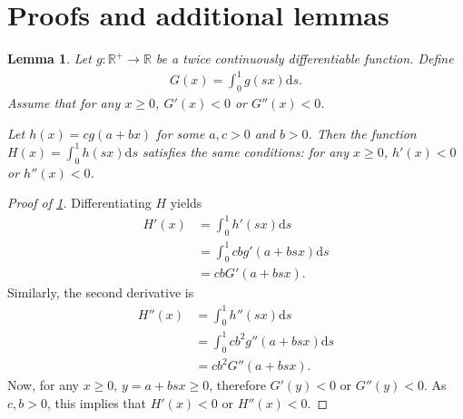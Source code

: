 \documentclass[a4paper]{article}
\newtheorem{lemma}{Lemma}
\newcommand{\ds}{\mathrm{d}s}
\begin{document}
\section{Proofs and additional lemmas}
\label{sec:proofs}

\begin{lemma}
    \label{lem:single_crossing_affine_transformation}
    Let $g: \mathbb{R}^+ \to \mathbb{R}$ be a twice continuously differentiable function.
    Define
    \begin{align*}
        G(x) = \int_0^1 g(sx) \ds.
    \end{align*}
    Assume that for any $x \geq 0$, $G'(x) < 0$ or $G''(x) < 0$.

    Let $h(x) = c g(a + bx)$ for some $a, c > 0$ and $b > 0$.
    Then the function $H(x) = \int_0^1 h(sx) \ds$ satisfies the same conditions: for any $x \geq 0$, $h'(x) < 0$ or $h''(x) < 0$.
\end{lemma}
\begin{proof}[Proof of \cref{lem:single_crossing_affine_transformation}]
    Differentiating $H$ yields
    \begin{align*}
        H'(x) &= \int_0^1 h'(sx) \ds \\
              &= \int_0^1 c b g'(a + bsx) \ds \\
              &= c b G'(a + bsx).
    \end{align*}
    Similarly, the second derivative is
    \begin{align*}
        H''(x) &= \int_0^1 h''(sx) \ds \\
               &= \int_0^1 c b^2 g''(a + bsx) \ds \\
               &= c b^2 G''(a + bsx).
    \end{align*}
    Now, for any $x \geq 0$, $y = a + bsx \geq 0$, therefore $G'(y) < 0$ or $G''(y) < 0$.
    As $c, b > 0$, this implies that $H'(x) < 0$ or $H''(x) < 0$.
\end{proof}
\end{document}
